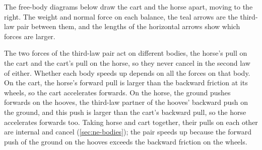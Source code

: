 The free-body diagrams below draw the cart and
the horse apart, moving to the right. The weight and normal force on each
balance, the teal arrows are the third-law pair between them, and the
lengths of the horizontal arrows show which forces are larger.
\begin{center}
\end{center}
The two forces of the third-law pair act on
different bodies, the horse's pull on the cart and the cart's pull on the
horse, so they never cancel in the second law of either. Whether each
body speeds up depends on all the forces on that body. On the cart, the
horse's forward pull is larger than the backward friction at its wheels,
so the cart accelerates forwards. On the horse, the ground pushes forwards
on the hooves, the third-law partner of the hooves' backward push on the
ground,
and this push is larger than the cart's backward pull, so the horse
accelerates forwards too. Taking horse and cart together, their pulls on
each other are internal and cancel (\cref{sec:ne-bodies}); the pair speeds
up because the forward push of the ground on the hooves exceeds the
backward friction on the wheels.

